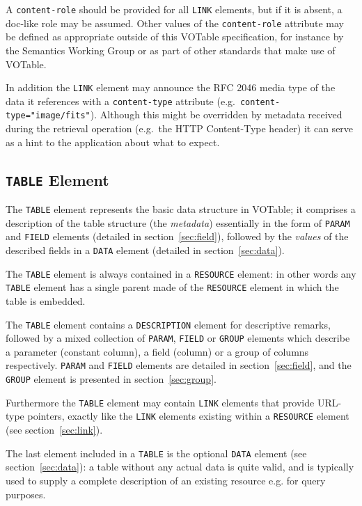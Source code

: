 \documentclass[11pt,a4paper]{ivoa}
\def\Aref#1{section~\ref{#1}}
\let\fg=\color
\def\attr#1{{\tt{\fg{DarkRed}#1}}}
\def\elem#1{{\tt{\fg{DarkRed}#1}}}
\def\attrval#1#2{{\tt{\fg{DarkRed}#1}="{\fg{DarkPurple}#2}"}}
\begin{document}
A \attr{content-role} should be provided for all \elem{LINK} elements,
but if it is absent, a doc-like role may be assumed.
Other values of the \attr{content-role} attribute may be defined
as appropriate outside of this VOTable specification,
for instance by the Semantics Working Group or as part of other
standards that make use of VOTable.

In addition the \elem{LINK} element
may announce the RFC 2046 media type of the data it references
with a \attr{content-type} attribute (e.g.\ \attrval{content-type}{image/fits}).
Although this might be overridden by metadata received during the
retrieval operation (e.g.\ the HTTP Content-Type header)
it can serve as a hint to the application about what to expect.

\subsection{\elem{TABLE} Element}
\label{elem:TABLE}

The \elem{TABLE} element represents the basic data structure in VOTable;
it comprises a description of the table structure (the {\em metadata})
essentially in the form of \elem{PARAM} and \elem{FIELD} elements
(detailed in \Aref{sec:field}),
followed by the {\em values} of the described fields in a \elem{DATA}
element (detailed in \Aref{sec:data}).

The \elem{TABLE} element is always contained in a \elem{RESOURCE} element:
in other words
any \elem{TABLE} element has a single parent made of the
\elem{RESOURCE} element
in which the table is embedded.

The \elem{TABLE} element contains
a {\elem{DESCRIPTION}} element for descriptive remarks, followed
by a mixed collection of \elem{PARAM}, \elem{FIELD} or \elem{GROUP} elements
which describe a parameter (constant column), a field (column) or a group of
columns respectively. \elem{PARAM} and \elem{FIELD} elements are detailed in
\Aref{sec:field}, and the \elem{GROUP} element
is presented in \Aref{sec:group}.

Furthermore the \elem{TABLE} element may contain {\elem{LINK}} elements
that provide URL-type pointers, exactly like the {\elem{LINK}} elements
existing within a \elem{RESOURCE} element (see \Aref{sec:link}).

The last element included in a \elem{TABLE} is the optional \elem{DATA}
element (see \Aref{sec:data}): a table without any
actual data is quite valid, and is typically used to supply a complete
description of an existing resource e.g. for query purposes.
\end{document}
